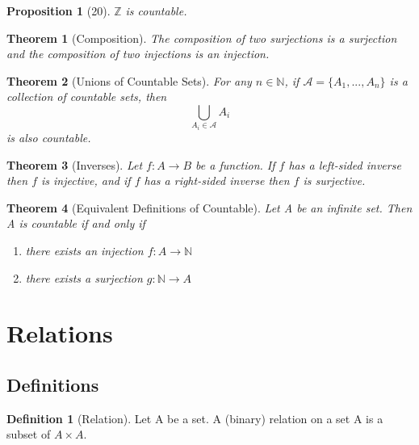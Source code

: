 \documentclass[12pt]{article}
\newtheorem*{thm*}{Theorem}
\newtheorem{prop}[thm]{Proposition}
\theoremstyle{definition}
\newtheorem{defn}[thm]{Definition}
\theoremstyle{remark}
\numberwithin{equation}{section}
\newcommand\Z{\mathbb Z}    %
\newcommand\N{\mathbb N}    %
\begin{document}
\begin{prop}[20]
        $\Z$ is countable.
\end{prop}




\begin{thm*}[Composition]
        The composition of two surjections is a surjection and the composition of two injections is an injection.
\end{thm*}



\begin{thm*}[Unions of Countable Sets]
        For any $n \in \N$, if $\mathcal{A} = \{A_1,...,A_n\}$ is a collection of countable sets, then \begin{equation}
                \bigcup\limits_{A_i \in \mathcal{A}} A_i
        \end{equation}
        is also countable.
\end{thm*}




\begin{thm*}[Inverses]
        Let $f:A \rightarrow B$ be a function. If $f$ has a left-sided inverse then $f$ is injective, and if $f$ has a right-sided inverse then $f$ is surjective.
\end{thm*}




\begin{thm*}[Equivalent Definitions of Countable]
        Let A be an infinite set. Then A is countable if and only if 
        \begin{enumerate}
                \item there exists an injection $f:A\rightarrow \N$
                \item there exists a surjection $g:\N\rightarrow A$
        \end{enumerate}
\end{thm*}




\clearpage


\section{Relations}



\subsection{Definitions}

\begin{defn}[Relation]
        Let A be a set. A (binary) relation on a set A is a subset of $A \times A$.
\end{defn}
\end{document}
